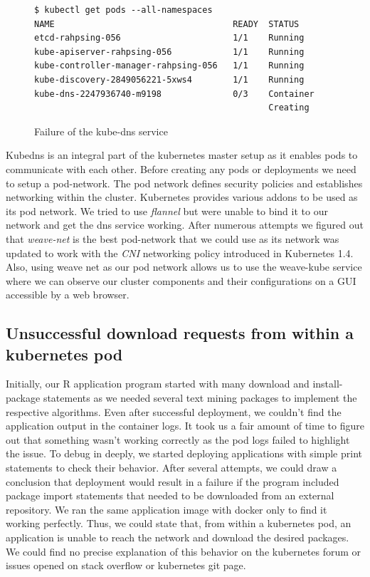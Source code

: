 \documentclass[9pt,twocolumn,twoside]{../../styles/osajnl}
\begin{document}
{\begin{figure}[H]
\begin{verbatim}
$ kubectl get pods --all-namespaces
NAME                                   READY  STATUS       
etcd-rahpsing-056                      1/1    Running          
kube-apiserver-rahpsing-056            1/1    Running           
kube-controller-manager-rahpsing-056   1/1    Running           
kube-discovery-2849056221-5xws4        1/1    Running         
kube-dns-2247936740-m9198              0/3    Container
                                              Creating
\end{verbatim}
\vspace{-3mm}
\caption{Failure of the kube-dns service}
\vspace{-3mm}
\label{Instantiation failure of the kube-dns service}
\end{figure}
Kubedns is an integral part of the kubernetes master setup as it
enables pods to communicate with each other. Before creating any pods
or deployments we need to setup a pod-network. The pod network defines
security policies and establishes networking within the
cluster. Kubernetes provides various addons to be used as its pod
network. We tried to use \emph{flannel} but were unable to bind it to
our network and get the dns service working. After numerous attempts
we figured out that \emph{weave-net} is the best pod-network that we
could use as its network was updated to work with the \emph{CNI}
networking policy introduced in Kubernetes 1.4. Also, using weave net
as our pod network allows us to use the weave-kube service where we
can observe our cluster components and their configurations on a GUI
accessible by a web browser.

\subsection{Unsuccessful download requests from within a kubernetes pod}

Initially, our R application program started with many download and
install-package statements as we needed several text mining packages
to implement the respective algorithms. Even after successful
deployment, we couldn't find the application output in the container
logs. It took us a fair amount of time to figure out that something
wasn't working correctly as the pod logs failed to highlight the
issue. To debug in deeply, we started deploying applications with
simple print statements to check their behavior. After several
attempts, we could draw a conclusion that deployment would result in a
failure if the program included package import statements that needed
to be downloaded from an external repository. We ran the same
application image with docker only to find it working perfectly. Thus,
we could state that, from within a kubernetes pod, an application is
unable to reach the network and download the desired packages. We
could find no precise explanation of this behavior on the kubernetes
forum or issues opened on stack overflow or kubernetes git page.

}
\end{document}
